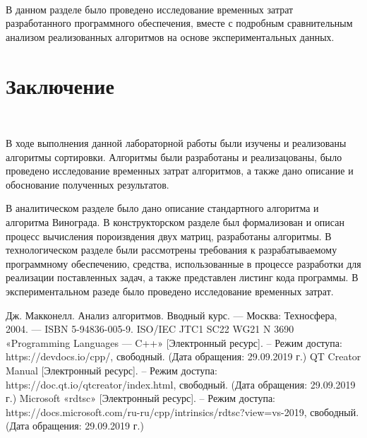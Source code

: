 \documentclass[12pt]{report}
\begin{document}
	~\
	
	В данном разделе было проведено исследование временных затрат разработанного программного обеспечения, вместе с подробным сравнительным анализом реализованных алгоритмов на основе экспериментальных
	данных.
	
	\chapter*{Заключение}
	
	~\
	
	В ходе выполнения данной лабораторной работы были изучены и реализованы алгоритмы сортировки. Алгоритмы были разработаны и реализацованы, было проведено исследование временных затрат алгоритмов, а
	также дано описание и обоснование полученных результатов.
	
	\vspace{0.5cm}
	В аналитическом разделе было дано описание стандартного алгоритма
	и алгоритма Винограда. В конструкторском разделе был формализован и
	описан процесс вычисления пороизвдения двух матриц, разработаны алгоритмы. В технологическом разделе были рассмотрены требования к разрабатываемому программному обеспечению, средства, использованные в процессе разработки для реализации поставленных задач, а также представлен
	листинг кода программы. В экспериментальном разеде было проведено исследование временных затрат.
	
	\begin{thebibliography}{}
		 Дж. Макконелл. Анализ алгоритмов. Вводный курс. — Москва: Техносфера, 2004. — ISBN 5-94836-005-9.
		 ISO/IEC JTC1 SC22 WG21 N 3690 «Programming Languages — C++» [Электронный ресурс]. – Режим доступа: https://devdocs.io/cpp/, свободный. (Дата обращения: 29.09.2019 г.)
		 QT Creator Manual [Электронный ресурс]. – Режим
		доступа: https://doc.qt.io/qtcreator/index.html, свободный. (Дата
		обращения: 29.09.2019 г.)
		 Microsoft «rdtsc» [Электронный ресурс]. – Режим доступа:
		https://docs.microsoft.com/ru-ru/cpp/intrinsics/rdtsc?view=vs-2019,
		свободный. (Дата обращения: 29.09.2019 г.)
	\end{thebibliography}
\end{document}
